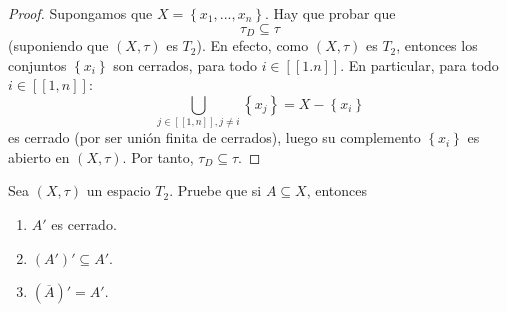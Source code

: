 \documentclass[12pt]{report}
\theoremstyle{largebreak}
\newcommand\natint[1]{\ensuremath{\left[\!\left[#1\right]\!\right] }}
\newcommand{\Cls}[1]{\ensuremath{\overline{#1}}}
\begin{document}
    \begin{proof}
        Supongamos que $X=\left\{x_1,...,x_n\right\}$. Hay que probar que
        \begin{equation*}
            \tau_D\subseteq\tau
        \end{equation*}
        (suponiendo que $(X,\tau)$ es $T_2$). En efecto, como $(X,\tau)$ es $T_2$, entonces los conjuntos $\left\{x_i\right\}$ son cerrados, para todo $i\in\natint{1.n}$. En particular, para todo $i\in\natint{1,n}$:
        \begin{equation*}
            \bigcup_{ j\in\natint{1,n},j\neq i}\left\{x_j\right\}=X-\left\{x_i\right\}
        \end{equation*}
        es cerrado (por ser unión finita de cerrados), luego su complemento $\left\{x_i\right\}$ es abierto en $(X,\tau)$. Por tanto, $\tau_D\subseteq\tau$.
    \end{proof}

    \begin{excer}
        Sea $(X,\tau)$ un espacio $T_2$. Pruebe que si $A\subseteq X$, entonces
        \begin{enumerate}
            \item $A'$ es cerrado.
            \item $\left(A'\right)'\subseteq A'$.
            \item $\left(\Cls{A}\right)'= A'$.
        \end{enumerate}
    \end{excer}
\end{document}
